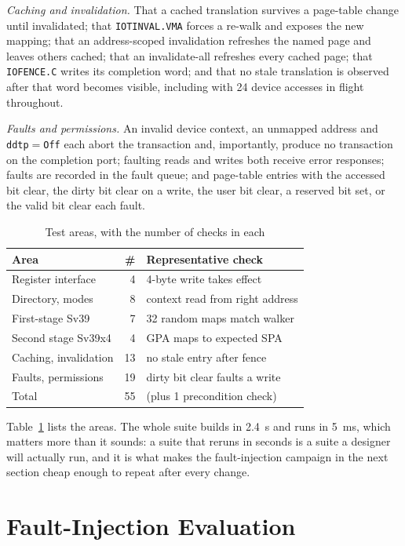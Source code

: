 \documentclass[journal]{IEEEtran}
\newcommand{\cmd}[1]{\mbox{\texttt{#1}}}
\begin{document}
\emph{Caching and invalidation.} That a cached translation survives a
page-table change until invalidated; that \cmd{IOTINVAL.VMA} forces a
re-walk and exposes the new mapping; that an address-scoped invalidation
refreshes the named page and leaves others cached; that an invalidate-all
refreshes every cached page; that \cmd{IOFENCE.C} writes its completion word;
and that no stale translation is observed after that word becomes visible,
including with 24 device accesses in flight throughout.

\emph{Faults and permissions.} An invalid device context, an unmapped address
and \texttt{ddtp}$=$\texttt{Off} each abort the transaction and, importantly,
produce no transaction on the completion port; faulting reads and writes both
receive error responses; faults are recorded in the fault queue; and
page-table entries with the accessed bit clear, the dirty bit clear on a write,
the user bit clear, a reserved bit set, or the valid bit clear each fault.

\begin{table}[!t]
\caption{Test areas, with the number of checks in each}
\label{tab:areas}
\centering\footnotesize
\begin{tabular}{lrl}
\toprule
Area & \# & Representative check \\
\midrule
Register interface    & 4  & 4-byte write takes effect \\
Directory, modes      & 8  & context read from right address \\
First-stage Sv39      & 7  & 32 random maps match walker \\
Second stage Sv39x4   & 4  & GPA maps to expected SPA \\
Caching, invalidation & 13 & no stale entry after fence \\
Faults, permissions   & 19 & dirty bit clear faults a write \\
\midrule
Total                 & 55 & (plus 1 precondition check) \\
\bottomrule
\end{tabular}
\end{table}

Table~\ref{tab:areas} lists the areas. The whole suite builds in 2.4~s and runs
in 5~ms, which matters more than it sounds: a suite that reruns in seconds is a
suite a designer will actually run, and it is what makes the fault-injection
campaign in the next section cheap enough to repeat after every change.

\section{Fault-Injection Evaluation}
\end{document}
